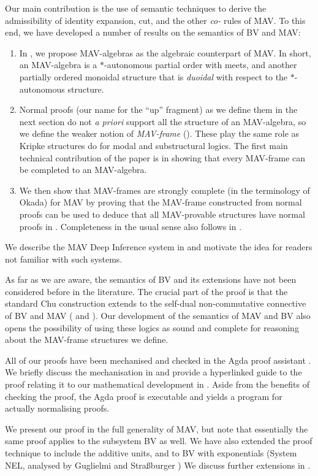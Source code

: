 Our main contribution is the use of semantic techniques to derive the admissibility of identity expansion, cut, and the other \emph{co-} rules of MAV. To this end, we have developed a number of results on the semantics of BV and MAV:
\begin{enumerate}
      \item In , we propose MAV-algebras as the algebraic counterpart of MAV. In short, an MAV-algebra is a $*$-autonomous partial order with meets, and another partially ordered monoidal structure that is \emph{duoidal} with respect to the $*$-autonomous structure.
      \item Normal proofs (our name for the ``up'' fragment) as we define them in the next section do not {\it a priori} support all the structure of an MAV-algebra, so we define the weaker notion of \emph{MAV-frame} (). These play the same role as Kripke structures do for modal and substructural logics. The first main technical contribution of the paper is in showing that every MAV-frame can be completed to an MAV-algebra.
      \item We then show that MAV-frames are strongly complete (in the terminology of Okada) for MAV by proving that the MAV-frame constructed from normal proofs can be used to deduce that all MAV-provable structures have normal proofs in . Completeness in the usual sense also follows in .
\end{enumerate}

We describe the MAV Deep Inference system in  and motivate the idea for readers not familiar with such systems.

As far as we are aware, the semantics of BV and its extensions have not been considered before in the literature. The crucial part of the proof is that the standard Chu construction extends to the self-dual non-commutative connective of BV and MAV ( and ). Our development of the semantics of MAV and BV also opens the possibility of using these logics as sound and complete for reasoning about the MAV-frame structures we define.

All of our proofs have been mechanised and checked in the Agda proof assistant \cite{Agda264}. We briefly discuss the mechanisation in  and provide a hyperlinked guide to the proof relating it to our mathematical development in . Aside from the benefits of checking the proof, the Agda proof is executable and yields a program for actually normalising proofs.

We present our proof in the full generality of MAV, but note that essentially the same proof applies to the subsystem BV as well. We have also extended the proof technique to include the additive units, and to BV with exponentials (System NEL, analysed by Guglielmi and Stra{\ss}burger \cite{Burger_2011,GuglielmiS11}) We discuss further extensions in .
